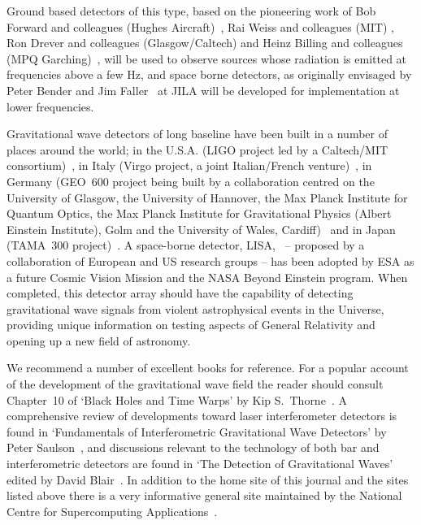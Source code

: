 \documentclass{article}
\begin{document}
Ground based detectors of this type, based on the pioneering work of Bob Forward
and colleagues (Hughes Aircraft)~\cite{Forward}, Rai Weiss and colleagues (MIT)
\cite{Weiss}, Ron Drever and colleagues (Glasgow/Caltech) \cite{Drever1,
Drever2} and Heinz Billing and colleagues (MPQ Garching)~\cite{Billing}, will be
used to observe sources whose radiation is emitted at frequencies above a few
Hz, and space borne detectors, as originally envisaged by Peter Bender and Jim
Faller~\cite{BenderFaller1, BenderFaller2} at JILA will be developed for
implementation at lower frequencies. 

Gravitational wave detectors of long baseline have been built in a number of
places around the world; in the U.S.A. (LIGO project led by a Caltech/MIT
consortium)~\cite{LIGOS5, LIGOweb}, in Italy (Virgo project, a joint
Italian/French venture)~\cite{Acernese:2007, Virgoweb}, in Germany (GEO~600
project being built by a collaboration centred on the University of Glasgow, the
University of Hannover, the Max Planck Institute for Quantum Optics, the Max
Planck Institute for Gravitational Physics (Albert Einstein Institute), Golm and
the University of Wales, Cardiff)~\cite{Willke:2007, GEOweb} and in Japan
(TAMA~300 project)~\cite{TAMAStatus, TAMAweb}. A space-borne detector,
LISA,~\cite{LISA, NASAweb, ESAweb} -- proposed by a collaboration of European
and US research groups -- has been adopted by ESA as a future Cosmic Vision
Mission and the NASA Beyond Einstein program. When completed, this detector
array should have the capability of detecting gravitational wave signals from
violent astrophysical events in the Universe, providing unique information on
testing aspects of General Relativity and opening up a new field of astronomy.

We recommend a number of excellent books for reference. For a popular account of
the development of the gravitational wave field the reader should consult
Chapter~10 of `Black Holes and Time Warps' by Kip S.\ Thorne~\cite{Thorne}. A
comprehensive review of developments toward laser interferometer detectors is
found in `Fundamentals of Interferometric Gravitational Wave Detectors' by Peter
Saulson~\cite{Saulsonbook}, and discussions relevant to the technology of both
bar and interferometric detectors are found in `The Detection of Gravitational
Waves' edited by David Blair~\cite{Blair}. In addition to the home site of this
journal and the sites listed above there is a very informative general site
maintained by the National Centre for Supercomputing Applications~\cite{NCSA}.
\end{document}
